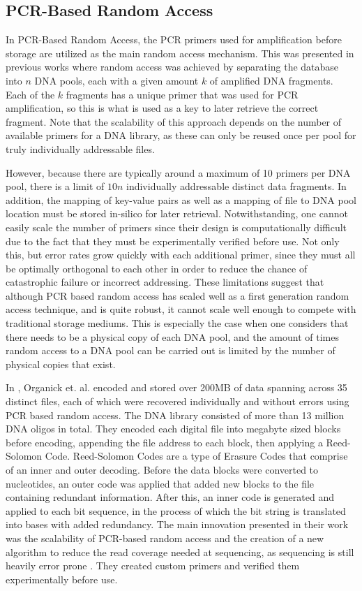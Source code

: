\documentclass[a4paper,conference]{IEEEtran}
\begin{document}
\subsection{PCR-Based Random Access}
In PCR-Based Random Access, the PCR primers used for amplification before storage are utilized as the main random access mechanism. This was presented in previous works \cite{} where random access was achieved by separating the database into $n$ DNA pools, each with a given amount $k$ of amplified DNA fragments. Each of the $k$ fragments has a unique primer that was used for PCR amplification, so this is what is used as a key to later retrieve the correct fragment. Note that the scalability of this approach depends on the number of available primers for a DNA library, as these can only be reused once per pool for truly individually addressable files.

However, because there are typically around a maximum of 10 primers per DNA pool, there is a limit of $10n$ individually addressable distinct data fragments. In addition, the mapping of key-value pairs as well as a mapping of file to DNA pool location must be stored in-silico for later retrieval. Notwithstanding, one cannot easily scale the number of primers since their design is computationally difficult due to the fact that they must be experimentally verified before use. Not only this, but error rates grow quickly with each additional primer, since they must all be optimally orthogonal to each other in order to reduce the chance of catastrophic failure or incorrect addressing. These limitations suggest that although PCR based random access has scaled well as a first generation random access technique, and is quite robust, it cannot scale well enough to compete with traditional storage mediums. This is especially the case when one considers that there needs to be a physical copy of each DNA pool, and the amount of times random access to a DNA pool can be carried out is limited by the number of physical copies that exist.

In \cite{}, Organick et. al. encoded and stored over 200MB of data spanning across 35 distinct files, each of which were recovered individually and without errors using PCR based random access. The DNA library consisted of more than 13 million DNA oligos in total. They encoded each digital file into megabyte sized blocks before encoding, appending the file address to each block, then applying a Reed-Solomon Code. Reed-Solomon Codes are a type of Erasure Codes that comprise of an inner and outer decoding. Before the data blocks were converted to nucleotides, an outer code was applied that added new blocks to the file containing redundant information. After this, an inner code is generated and applied to each bit sequence, in the process of which the bit string is translated into bases with added redundancy. The main innovation presented in their work was the scalability of PCR-based random access and the creation of a new algorithm to reduce the read coverage needed at sequencing, as sequencing is still heavily error prone \cite{}. They created custom primers and verified them experimentally before use. 
\end{document}
